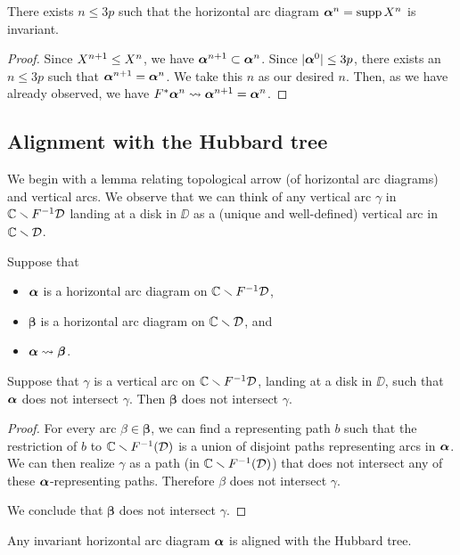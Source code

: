 \begin{prop}\label{invariance}
  There exists $n\leq 3p$ such that the horizontal arc diagram ${\mbox{\boldmath$\alpha$} }^n = \operatorname{supp}  X^{n}$ is invariant.
\end{prop}

\begin{proof}
  Since $ X^{n+1} \leq  X^{n}$, we have
${\mbox{\boldmath$\alpha$} }^{n+1}\subset {\mbox{\boldmath$\alpha$} }^n$.
Since $|{\mbox{\boldmath$\alpha$} }^0|\leq 3p$, there exists an  $n\leq 3p$ such that ${\mbox{\boldmath$\alpha$} }^{n+1}={\mbox{\boldmath$\alpha$} }^n$. We take this $n$ as our desired $n$. 
Then, as we have already observed, we have $F^* {\mbox{\boldmath$\alpha$} }^n \leadsto {\mbox{\boldmath$\alpha$} }^{n+1} = {\mbox{\boldmath$\alpha$} }^n$.
\end{proof}

\subsection{Alignment with the Hubbard tree}
\newcommand{\bbb}{\boldsymbol \beta}
We begin with a lemma relating topological arrow (of horizontal arc diagrams) and vertical arcs. 
We observe that we can think of any vertical arc $\gamma$ in ${\Bbb C} \smallsetminus F^{-1}{\mathcal D}$ landing at a disk in $\DD$ as a (unique and well-defined) vertical arc in ${\Bbb C} \smallsetminus {\mathcal D}$.
\begin{lem} \label{lem:ta-int}
Suppose that 
\begin{itemize}
\item
${\mbox{\boldmath$\alpha$} }$ is a horizontal arc diagram on ${\Bbb C} \smallsetminus F^{-1}{\mathcal D}$,
\item
$\bbb$ is a horizontal arc diagram on ${\Bbb C} \smallsetminus {\mathcal D}$, and 
\item
$\bal \ta \bbb$.
\end{itemize}
Suppose that $\gamma$ is a vertical arc on ${\Bbb C} \smallsetminus F^{-1}{\mathcal D}$, landing at a disk in $\DD$, such that ${\mbox{\boldmath$\alpha$} }$ does not intersect $\gamma$.
Then $\bbb$ does not intersect $\gamma$.
\end{lem}
\begin{proof}
For every arc $\beta \in \bbb$, 
we can find a representing path $b$ such that the restriction of $b$ to ${\Bbb C} \smallsetminus F^{-1}({\mathcal D})$ is a union of disjoint paths representing arcs in ${\mbox{\boldmath$\alpha$} }$. 
We can then realize $\gamma$ as a path (in ${\Bbb C} \smallsetminus F^{-1}({\mathcal D})$)
 that does not intersect any of these ${\mbox{\boldmath$\alpha$} }$-representing paths. 
Therefore $\beta$ does not intersect $\gamma$.

We conclude that $\bbb$ does not intersect $\gamma$.
\end{proof}

\begin{lem}\label{H-perp}
  Any invariant horizontal arc diagram  ${\mbox{\boldmath$\alpha$} }$
is aligned with the Hubbard tree.
\end{lem}

